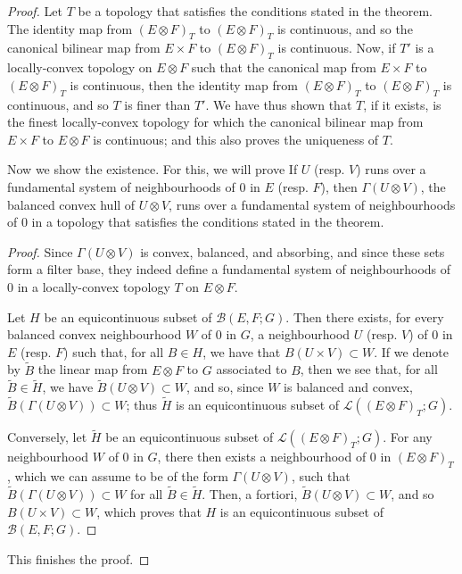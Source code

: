 \documentclass{article}
\theoremstyle{plain}
\newenvironment{proposition}[1]
    {\renewcommand\theinnercustomproposition{#1}\innercustomproposition}
    {\endinnercustomproposition}
\theoremstyle{definition}
\newcommand{\BB}{\mathcal{B}}
\newcommand{\LL}{\mathcal{L}}
\newcommand{\oldpage}[1]{\marginpar{\phantom{.}\\\footnotesize$\Big\vert$ \textit{p.~#1}}}
\begin{document}
\begin{proof}
  Let $T$ be a topology that satisfies the conditions stated in the theorem.
  The identity map from $(E\otimes F)_T$ to $(E\otimes F)_T$ is continuous, and so the canonical bilinear map from $E\times F$ to $(E\otimes F)_T$ is continuous.
  Now, if $T'$ is a locally-convex topology on $E\otimes F$ such that the canonical map from $E\times F$ to $(E\otimes F)_T$ is continuous, then the identity map from $(E\otimes F)_T$ to $(E\otimes F)_T$ is continuous, and so $T$ is finer than $T'$.
  We have thus shown that $T$, if it exists, is the finest locally-convex topology for which the canonical bilinear map from $E\times F$ to $E\otimes F$ is continuous;
  and this also proves the uniqueness of $T$.

  Now we show the existence.
\oldpage{2}
  For this, we will prove
  \begin{proposition}{1}
    If $U$ (resp. $V$) runs over a fundamental system of neighbourhoods of $0$ in $E$ (resp. $F$), then $\Gamma(U\otimes V)$, the balanced convex hull of $U\otimes V$, runs over a fundamental system of neighbourhoods of $0$ in a topology that satisfies the conditions stated in the theorem.
  \end{proposition}

  \begin{proof}
    Since $\Gamma(U\otimes V)$ is convex, balanced, and absorbing, and since these sets form a filter base, they indeed define a fundamental system of neighbourhoods of $0$ in a locally-convex topology $T$ on $E\otimes F$.

    Let $H$ be an equicontinuous subset of $\BB(E,F;G)$.
    Then there exists, for every balanced convex neighbourhood $W$ of $0$ in $G$, a neighbourhood $U$ (resp. $V$) of $0$ in $E$ (resp. $F$) such that, for all $B\in H$, we have that $B(U\times V)\subset W$.
    If we denote by $\widetilde{B}$ the linear map from $E\otimes F$ to $G$ associated to $B$, then we see that, for all $\widetilde{B}\in\widetilde{H}$, we have $\widetilde{B}(U\otimes V)\subset W$, and so, since $W$ is balanced and convex, $\widetilde{B}(\Gamma(U\otimes V))\subset W$;
    thus $\widetilde{H}$ is an equicontinuous subset of $\LL((E\otimes F)_T;G)$.

    Conversely, let $\widetilde{H}$ be an equicontinuous subset of $\LL((E\otimes F)_T;G)$.
    For any neighbourhood $W$ of $0$ in $G$, there then exists a neighbourhood of $0$ in $(E\otimes F)_T$, which we can assume to be of the form $\Gamma(U\otimes V)$, such that $\widetilde{B}(\Gamma(U\otimes V))\subset W$ for all $\widetilde{B}\in\widetilde{H}$.
    Then, a fortiori, $\widetilde{B}(U\otimes V)\subset W$, and so $B(U\times V)\subset W$, which proves that $H$ is an equicontinuous subset of $\BB(E,F;G)$.
  \end{proof}
  This finishes the proof.
\end{proof}
\end{document}
